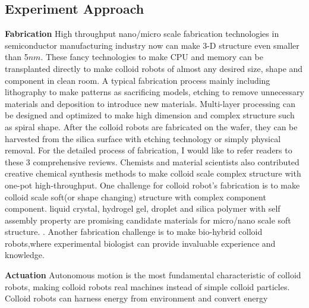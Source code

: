 \subsection{Experiment Approach}
\textbf{Fabrication}  High throughput nano/micro scale fabrication technologies in semiconductor manufacturing industry now can make 3-D structure even smaller than 5$nm$.\cite{mokhlesi2010three} These fancy technologies to make CPU and memory can be transplanted directly to make colloid robots of almost any desired size, shape and component in clean room.\cite{koman2018colloidal} A typical fabrication process mainly including lithography to make patterns as sacrificing models, etching to remove unnecessary materials and deposition to introduce new materials. Multi-layer processing can be designed and optimized to make high dimension and complex structure such as spiral shape\cite{zhang2009artificial}. After the colloid robots are fabricated on the wafer, they can be harvested from the silica surface with etching technology or simply physical removal. For the detailed process of fabrication, I would like to refer readers to these 3 comprehensive reviews\cite{wong2016synthetic,wang2017emerging, zha2018tubular}. Chemists and material scientists also contributed creative chemical synthesis methods to make colloid scale complex structure with one-pot high-throughput\cite{youssef2016shape,gong2017patchy,wang2019active}. One challenge for colloid robot's fabrication is to   make  colloid scale soft(or shape changing) structure with complex component component. liquid crystal, hydrogel gel, droplet and silica polymer with self assembly property are promising candidate materials for micro/nano scale soft structure. \cite{leong2009tetherless,denkov2015self,zhang2017printing,wei2019molecular}. Another fabrication challenge is to make bio-hybrid colloid robots,where experimental biologist can provide invaluable experience and knowledge.\cite{stanton2016biohybrid,magdanz2013development}

\textbf{Actuation} Autonomous motion is the most fundamental characteristic of colloid robots, making colloid robots real machines instead of simple colloid particles. Colloid robots can harness energy from environment and convert energy 


